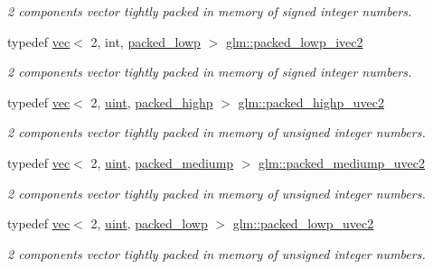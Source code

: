 \begin{DoxyCompactItemize}
\begin{DoxyCompactList}\small\item\em 2 components vector tightly packed in memory of signed integer numbers. \end{DoxyCompactList}\item 
typedef \hyperlink{structglm_1_1vec}{vec}$<$ 2, int, \hyperlink{namespaceglm_a36ed105b07c7746804d7fdc7cc90ff25ac36a4bd74559be2c0b65bc48e5953b8b}{packed\+\_\+lowp} $>$ \hyperlink{group__gtc__type__aligned_gabd82de5d7aef1f8373fe14cd05ce617c}{glm\+::packed\+\_\+lowp\+\_\+ivec2}
\begin{DoxyCompactList}\small\item\em 2 components vector tightly packed in memory of signed integer numbers. \end{DoxyCompactList}\item 
typedef \hyperlink{structglm_1_1vec}{vec}$<$ 2, \hyperlink{group__core__precision_ga4fd29415871152bfb5abd588334147c8}{uint}, \hyperlink{namespaceglm_a36ed105b07c7746804d7fdc7cc90ff25a8e8791ee77fe079b1291f710d88031bf}{packed\+\_\+highp} $>$ \hyperlink{group__gtc__type__aligned_gafd17d664314ead069de290b1d5137c47}{glm\+::packed\+\_\+highp\+\_\+uvec2}
\begin{DoxyCompactList}\small\item\em 2 components vector tightly packed in memory of unsigned integer numbers. \end{DoxyCompactList}\item 
typedef \hyperlink{structglm_1_1vec}{vec}$<$ 2, \hyperlink{group__core__precision_ga4fd29415871152bfb5abd588334147c8}{uint}, \hyperlink{namespaceglm_a36ed105b07c7746804d7fdc7cc90ff25a9604654c3b137cd7898689fd34b25bc0}{packed\+\_\+mediump} $>$ \hyperlink{group__gtc__type__aligned_ga18dd6e7cd05a4239428b2a0751d48d4a}{glm\+::packed\+\_\+mediump\+\_\+uvec2}
\begin{DoxyCompactList}\small\item\em 2 components vector tightly packed in memory of unsigned integer numbers. \end{DoxyCompactList}\item 
typedef \hyperlink{structglm_1_1vec}{vec}$<$ 2, \hyperlink{group__core__precision_ga4fd29415871152bfb5abd588334147c8}{uint}, \hyperlink{namespaceglm_a36ed105b07c7746804d7fdc7cc90ff25ac36a4bd74559be2c0b65bc48e5953b8b}{packed\+\_\+lowp} $>$ \hyperlink{group__gtc__type__aligned_ga48ab6ca01a9d2418365ca7c3ea1183e8}{glm\+::packed\+\_\+lowp\+\_\+uvec2}
\begin{DoxyCompactList}\small\item\em 2 components vector tightly packed in memory of unsigned integer numbers. \end{DoxyCompactList}\item 

\end{DoxyCompactItemize}
